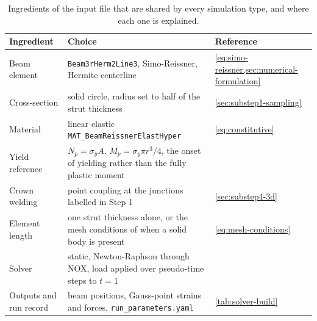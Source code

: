 \begin{table}[htb]
  \centering
  \begin{tabular}{@{}>{\raggedright\arraybackslash}m{}>{\raggedright\arraybackslash}m{}>{\raggedright\arraybackslash}m{}@{}}
    \toprule
    \textbf{Ingredient} & \textbf{Choice} & \textbf{Reference} \\
    \midrule
    Beam element & \texttt{Beam3rHerm2Line3}, Simo-Reissner, Hermite centerline & \cref{eq:simo-reissner,sec:numerical-formulation} \\
    \midrule
    Cross-section & solid circle, radius set to half of the strut thickness & \cref{sec:substep1-sampling} \\
    \midrule
    Material & linear elastic \texttt{MAT\_BeamReissnerElastHyper} & \cref{eq:constitutive} \\
    \midrule
    Yield reference & $N_p = \sigma_y A$, $M_p = \sigma_y \pi r^3 / 4$, the onset of yielding rather than the fully plastic moment & \citet{datz2025} \\
    \midrule
    Crown welding & point coupling at the junctions labelled in Step 1 & \cref{sec:substep4-3d} \\
    \midrule
    Element length & one strut thickness alone, or the mesh conditions of \citet{steinbrecher2020} when a solid body is present & \cref{eq:mesh-conditions} \\
    \midrule
    Solver & static, Newton-Raphson through NOX, load applied over pseudo-time steps to $t = 1$ &  \\
    \midrule
    Outputs and run record & beam positions, Gauss-point strains and forces, \texttt{run\_parameters.yaml} & \cref{tab:solver-build} \\
    \bottomrule
  \end{tabular}
  \caption{Ingredients of the input file that are shared by every simulation type, and where each one is explained.}
  \label{tab:common-ingredients}
\end{table}

